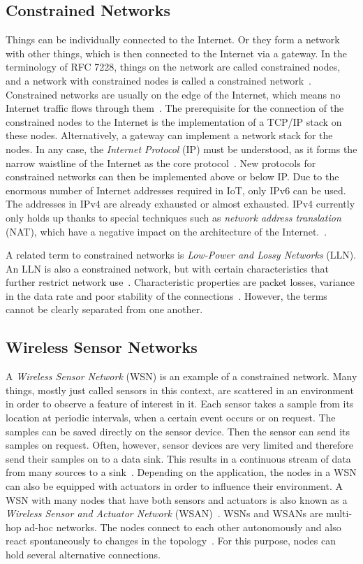 \documentclass[english,version-2019-11]{uzl-thesis}
\begin{document}
\subsection{Constrained Networks}
Things can be individually connected to the Internet.
Or they form a network with other things,
which is then connected to the Internet via a gateway.
In the terminology of RFC 7228, things on the network are
called constrained nodes, and a network with constrained nodes
is called a constrained network~\cite{rfc7228}.
Constrained networks are usually on the edge of the Internet,
which means no Internet traffic flows through them~\cite{AndreasTeubler}.
The prerequisite for the connection of the constrained
nodes to the Internet is the implementation
of a TCP/IP stack on these nodes. Alternatively,
a gateway can implement a network stack for the nodes.
In any case, the \emph{Internet Protocol} (IP) must be understood,
as it forms the narrow waistline of the Internet
as the core protocol~\cite{smallWaist}. New protocols for constrained networks can then be implemented above or below IP.
Due to the enormous number of Internet addresses required in IoT,
only IPv6 can be used. The addresses in IPv4 are already exhausted
or almost exhausted. IPv4 currently only holds up thanks to special techniques such as \emph{network address translation} (NAT), which have a negative impact on the architecture of the Internet.~\cite{Kurose}.

A related term to constrained networks is \emph{Low-Power and Lossy Networks} (LLN).
An LLN is also a constrained network, but with certain characteristics that further restrict network use~\cite{rfc7228}. Characteristic properties are packet losses, variance in the data rate and poor stability of the connections~\cite{rfc7228}. However, the terms cannot be clearly separated from one another.



\subsection{Wireless Sensor Networks}
A \emph{Wireless Sensor Network} (WSN) is an example of a constrained network.
Many things, mostly just called sensors in this context,
are scattered in an environment in order to observe a feature of interest in it.
Each sensor takes a sample from its location at periodic intervals, when a certain event occurs or on request. The samples can be saved directly on the sensor device.
Then the sensor can send its samples on request.
Often, however, sensor devices are very limited and therefore send their samples on to a data sink.
This results in a continuous stream of data from
many sources to a sink~\cite{BookCisco}.
Depending on the application, the nodes in a WSN can also be equipped with actuators in order to influence their environment. A WSN with many nodes that have both sensors and actuators is also known as a \emph{Wireless Sensor and Actuator Network} (WSAN)~\cite{BookCisco}.
WSNs and WSANs are multi-hop ad-hoc networks. The nodes connect to each other autonomously and also react spontaneously to changes in the topology~\cite{BookCisco}. For this purpose, nodes can hold several alternative connections.
\end{document}
